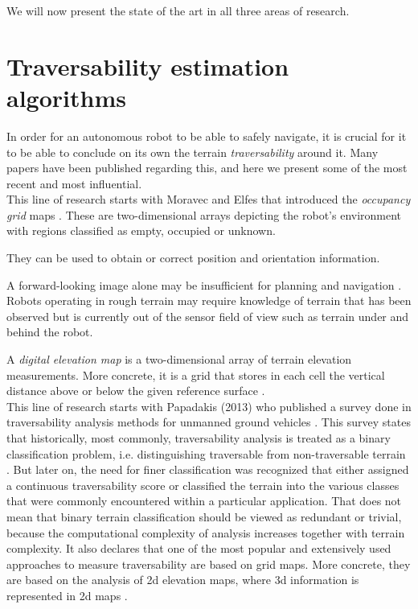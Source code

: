 \documentclass[12pt,a4paper]{report}
\newcommand{\term}{\textit}
\begin{document}
	We will now present the state of the art in all three areas of research.
	\\
	
	\section{Traversability estimation algorithms}
	\label{sec:bg:trav}
	
	In order for an autonomous robot to be able to safely navigate, it is crucial 
	for it to be able to conclude on its own the terrain \term{traversability} 
	around it. Many papers have been published regarding this, and here we present 
	some of the most recent and most influential.
	\\
	
	This line of research starts with Moravec and Elfes that introduced the 
	\term{occupancy grid} maps \cite{Moravec}. These are two-dimensional arrays 
	depicting the robot’s environment with regions classified as empty, occupied 
	or unknown.
	
	
	They can be used to obtain or correct position and orientation information.
	
	
	A forward-looking image alone may be insufficient for planning and navigation
	\cite{Kweon}. Robots operating in rough terrain may require knowledge of 
	terrain that has been observed but is currently out of the sensor field of
	view such as terrain under and behind the robot.
	
	A \term{digital elevation map} is a two-dimensional array of terrain 
	elevation measurements. More concrete, it is a grid that stores in each cell 
	the vertical distance above or below the given reference surface \cite{Kweon}.
	\\
	
	This line of research starts with Papadakis (2013) who published a 
	survey done in traversability analysis methods for unmanned ground vehicles 
	\cite{Papadakis}. 
	This survey states that historically, most commonly, traversability analysis is treated 
	as a binary classification problem, i.e. distinguishing traversable from 
	non-traversable terrain \cite{Suger, Hirose, Wigness}. 
	But later on, the need for finer classification was recognized that either assigned 
	a continuous traversability score or classified the terrain into the various classes 
	that were commonly encountered within a particular application.
	That does not mean that binary terrain classification should be viewed as redundant
	or trivial, because the computational complexity of analysis increases together 
	with terrain complexity.
	It also declares that one of the most popular and extensively used approaches 
	to measure traversability are based on grid 
	maps. More concrete, they are based on the analysis of 2d elevation maps, 
	where 3d information is represented in 2d maps \cite{Suger}.
	\\
	
\end{document}
